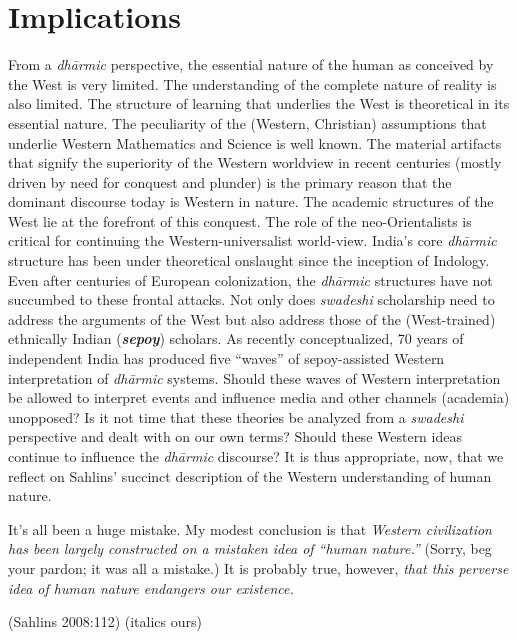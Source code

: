 \section*{Implications}

From a \textit{dhārmic} perspective, the essential nature of the human as conceived by the West is very limited. The understanding of the complete nature of reality is also limited. The structure of learning that underlies the West is theoretical in its essential nature. The peculiarity of the (Western, Christian) assumptions that underlie Western Mathematics and Science is well known. The material artifacts that signify the superiority of the Western worldview in recent centuries (mostly driven by need for conquest and plunder) is the primary reason that the dominant discourse today is Western in nature. The academic structures of the West lie at the forefront of this conquest. The role of the neo-Orientalists is critical for continuing the Western-universalist world-view. India's core \textit{dhārmic} structure has been under theoretical onslaught since the inception of Indology. Even after centuries of European colonization, the \textit{dhārmic} structures have not succumbed to these frontal attacks. Not only does \textit{swadeshi} scholarship need to address the arguments of the West but also address those of the (West-trained) ethnically Indian (\textbf{\textit{sepoy}}) scholars. As recently conceptualized, 70 years of independent India has produced five “waves” of sepoy-assisted Western interpretation of \textit{dhārmic} systems. Should these waves of Western interpretation be allowed to interpret events and influence media and other channels (academia) unopposed? Is it not time that these theories be analyzed from a \textit{swadeshi} perspective and dealt with on our own terms? Should these Western ideas continue to influence the \textit{dhārmic} discourse? It is thus appropriate, now, that we reflect on Sahlins' succinct description of the Western understanding of human nature.

\begin{myquote}
It's all been a huge mistake. My modest conclusion is that \textit{Western civilization has been largely constructed on a mistaken idea of “human nature.”} (Sorry, beg your pardon; it was all a mistake.) It is probably true, however, \textit{that this perverse idea of human nature endangers our existence.}
\end{myquote}

\hfill (Sahlins 2008:112) (italics ours)


